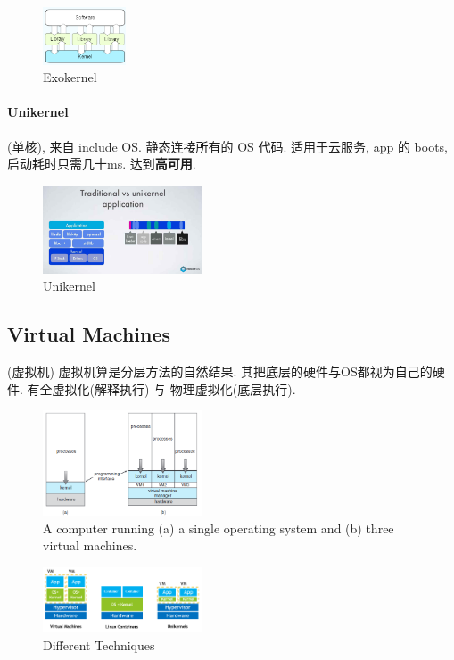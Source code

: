 \begin{figure}[!htb]
    \centering
    \includegraphics[width=0.22\textwidth]{pic/OS2/Exokernel.png}
    \caption{Exokernel}
\end{figure}

\paragraph{Unikernel} (单核), 来自 include OS. 静态连接所有的 OS 代码. 适用于云服务, app 的 boots, 启动耗时只需几十ms. 达到\textbf{高可用}.  

\begin{figure}[!htb]
    \centering
    \includegraphics[width=0.42\textwidth]{pic/OS2/Unikernel.png}
    \caption{Unikernel}
\end{figure}


\subsection{Virtual Machines}
(虚拟机) 虚拟机算是分层方法的自然结果. 其把底层的硬件与OS都视为自己的硬件. 有全虚拟化(解释执行) 与 物理虚拟化(底层执行). 

\begin{figure}[!htb]
    \centering
    \includegraphics[width=0.42\textwidth]{pic/OS2/virtual machines..png}
    \caption{A computer running (a) a single operating system and (b) three virtual machines.}
\end{figure}

\begin{figure}[!htb]
    \centering
    \includegraphics[width=0.42\textwidth]{pic/OS2/Different Techniques}
    \caption{Different Techniques}
\end{figure}
\newpage
\quad



